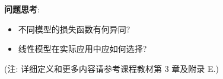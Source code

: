 \documentclass{../nndlcourse}
\begin{document}
\textbf{问题思考}:
\begin{itemize}
    \item 不同模型的损失函数有何异同?
    \item 线性模型在实际应用中应如何选择?
\end{itemize}

(注: 详细定义和更多内容请参考课程教材第 3 章及附录 E.)



\end{document}
